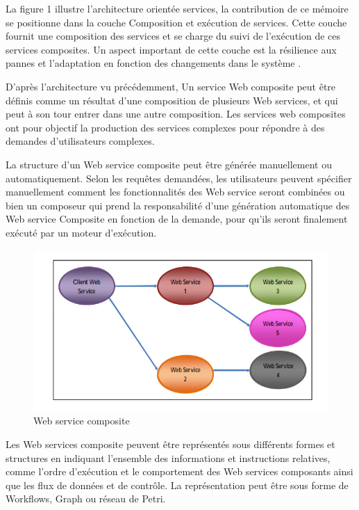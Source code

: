 La figure 1 illustre l'architecture orientée services, la contribution de ce mémoire se positionne dans la couche Composition et exécution de services.
Cette couche fournit une composition des services et se charge du suivi de l’exécution de ces services composites. Un aspect important de cette couche est la résilience aux
pannes et l’adaptation en fonction des changements dans le système \cite{1}.



D'après l'architecture vu précédemment, Un service Web composite peut être définis comme un  résultat d’une composition de plusieurs Web services, et qui peut à son tour entrer dans une autre composition.
Les  services web composites ont pour objectif  la production des services complexes pour répondre à des demandes d’utilisateurs complexes. 

La structure d’un Web service composite peut être générée manuellement ou automatiquement. Selon les requêtes demandées, les utilisateurs peuvent spécifier manuellement comment les fonctionnalités des Web service seront combinées ou bien  un composeur qui prend la responsabilité d’une génération automatique des Web service Composite en fonction de la demande, pour qu’ils seront finalement exécuté par un moteur d’exécution.


\begin{figure}[H]
\begin{center}
\includegraphics[width=1\linewidth]{images/CWS.jpg}
\end{center}
\caption{Web service composite}
\label{fig:2}
\end{figure}



Les Web services composite peuvent être représentés sous différents formes et structures en indiquant l’ensemble des informations et instructions relatives, comme l’ordre d’exécution et le comportement des Web services composants ainsi que les flux de données  et de contrôle.
La représentation peut être sous forme de Workflows, Graph ou réseau de Petri.



